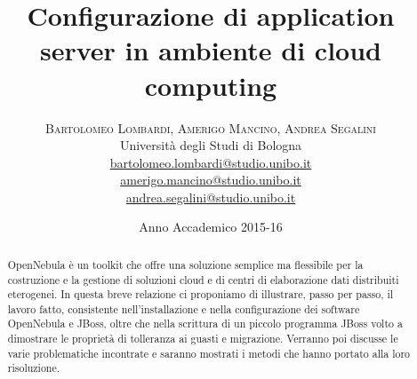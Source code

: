 \documentclass[twoside]{article}
\title{\vspace{-15mm}\fontsize{24pt}{10pt}\selectfont\textbf{Configurazione di application server in ambiente di cloud computing}} %
\author{
\large
\textsc{Bartolomeo Lombardi, Amerigo Mancino, Andrea Segalini}\\[2mm] %
\normalsize Università degli Studi di Bologna %
\vspace{5mm} \\
\normalsize \href{mailto:bartolomeo.lombardi@studio.unibo.it}{bartolomeo.lombardi@studio.unibo.it}\\
\normalsize \href{mailto:amerigo.mancino@studio.unibo.it}{amerigo.mancino@studio.unibo.it}\\
\normalsize \href{mailto:andrea.segalini@studio.unibo.it}{andrea.segalini@studio.unibo.it}
\vspace{-5mm}
}
\date{Anno Accademico 2015-16}
\begin{document}
\maketitle 


\begin{abstract}
\noindent
OpenNebula è un toolkit che offre una soluzione semplice ma flessibile per la costruzione e la gestione
di soluzioni cloud e di centri di elaborazione dati distribuiti eterogenei.
In questa breve relazione ci proponiamo di illustrare, passo per passo, il lavoro fatto, consistente
nell'installazione e nella configurazione dei software OpenNebula e JBoss, oltre che nella scrittura
di un piccolo programma JBoss volto a dimostrare le proprietà di tolleranza ai guasti e migrazione.
Verranno poi discusse le varie problematiche incontrate e saranno mostrati i metodi che hanno portato
alla loro risoluzione.
\end{abstract}


\vspace{15mm} %

\end{document}
